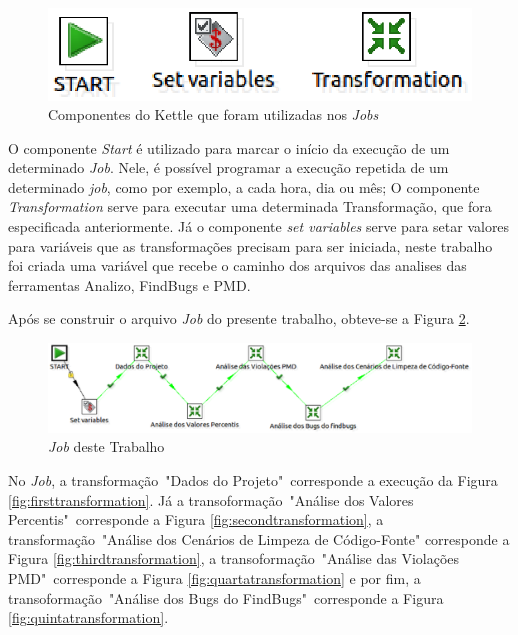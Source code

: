 \begin{apendicesenv}
\begin{figure}[h!]
\centering
\includegraphics[keepaspectratio=false,scale=0.60]{figuras/figuras_nilton/componentesjob.eps}
\caption{Componentes do Kettle que foram utilizadas nos \textit{Jobs}}
\label{fig:componentsjob}
\end{figure}
\FloatBarrier

O componente \textit{Start} é utilizado para marcar o início da execução de um determinado \textit{Job}. Nele, é possível programar a execução repetida de um determinado \textit{job}, como por exemplo, a cada hora, dia ou mês; O componente \textit{Transformation} serve para executar uma determinada Transformação, que fora especificada anteriormente. Já o componente \textit{set variables} serve para setar valores para variáveis que as transformações precisam para ser iniciada, neste trabalho foi criada uma variável que recebe o caminho dos arquivos das analises das ferramentas Analizo, FindBugs e PMD. 

Após se construir o arquivo \textit{Job} do presente trabalho, obteve-se a Figura \ref{fig:job}. 

\begin{figure}[h!]
\centering
\includegraphics[keepaspectratio=false,scale=0.5]{figuras/figuras_nilton/job.eps}
\caption{\textit{Job} deste Trabalho}
\label{fig:job}
\end{figure}
\FloatBarrier

No \textit{Job}, a transformação~"Dados do Projeto"~corresponde a execução da Figura \ref{fig:firsttransformation}. Já a transoformação~"Análise dos Valores Percentis"~corresponde a Figura \ref{fig:secondtransformation}, a transformação~"Análise dos Cenários de Limpeza de Código-Fonte" corresponde a Figura \ref{fig:thirdtransformation}, a transoformação~"Análise das Violações PMD"~corresponde a Figura \ref{fig:quartatransformation} e por fim, a transoformação~"Análise dos Bugs do FindBugs"~corresponde a Figura \ref{fig:quintatransformation}.




\end{apendicesenv}
